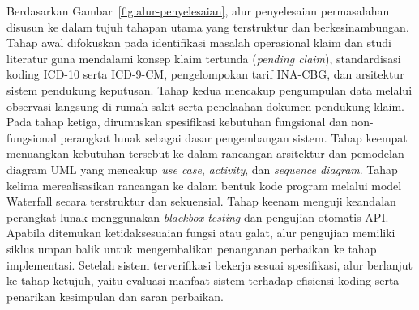 Berdasarkan Gambar~\ref{fig:alur-penyelesaian}, alur penyelesaian permasalahan disusun ke dalam tujuh tahapan utama yang terstruktur dan berkesinambungan. Tahap awal difokuskan pada identifikasi masalah operasional klaim dan studi literatur guna mendalami konsep klaim tertunda (\textit{pending claim}), standardisasi koding ICD-10 serta ICD-9-CM, pengelompokan tarif INA-CBG, dan arsitektur sistem pendukung keputusan. Tahap kedua mencakup pengumpulan data melalui observasi langsung di rumah sakit serta penelaahan dokumen pendukung klaim. Pada tahap ketiga, dirumuskan spesifikasi kebutuhan fungsional dan non-fungsional perangkat lunak sebagai dasar pengembangan sistem. Tahap keempat menuangkan kebutuhan tersebut ke dalam rancangan arsitektur dan pemodelan diagram UML yang mencakup \textit{use case}, \textit{activity}, dan \textit{sequence diagram}. Tahap kelima merealisasikan rancangan ke dalam bentuk kode program melalui model Waterfall secara terstruktur dan sekuensial. Tahap keenam menguji keandalan perangkat lunak menggunakan \textit{blackbox testing} dan pengujian otomatis API. Apabila ditemukan ketidaksesuaian fungsi atau galat, alur pengujian memiliki siklus umpan balik untuk mengembalikan penanganan perbaikan ke tahap implementasi. Setelah sistem terverifikasi bekerja sesuai spesifikasi, alur berlanjut ke tahap ketujuh, yaitu evaluasi manfaat sistem terhadap efisiensi koding serta penarikan kesimpulan dan saran perbaikan.

